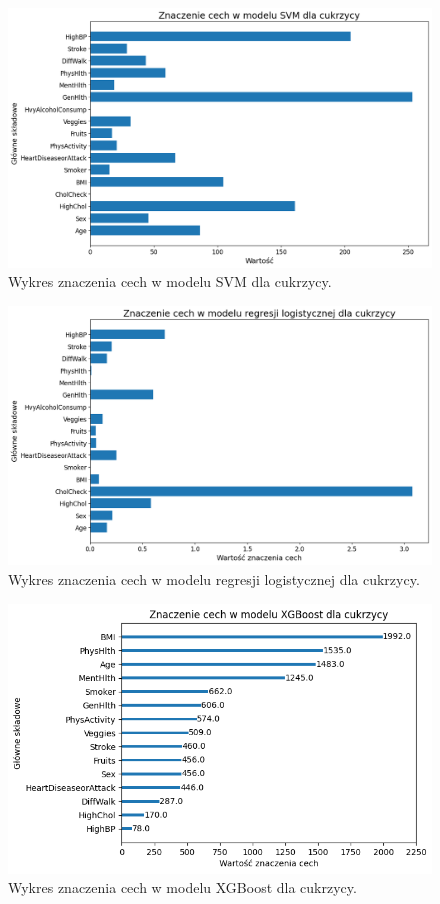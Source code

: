 \documentclass[onecolumn,12pt]{article}
\begin{document}
\begin{figure}[H]
    \centering
    \includegraphics[width=0.90\linewidth]{raport/graphs/cukrzyca_svm.png}
    \captionsetup{justification=centering}
    \caption{Wykres znaczenia cech w modelu SVM dla cukrzycy.}
\end{figure}

\begin{figure}[H]
    \centering
    \includegraphics[width=0.90\linewidth]{raport/graphs/cukrzyca_regresja.png}
    \captionsetup{justification=centering}
    \caption{Wykres znaczenia cech w modelu regresji logistycznej dla cukrzycy.}
\end{figure}

\begin{figure}[H]
    \centering
    \includegraphics[width=0.90\linewidth]{raport/graphs/cukrzyca_xgb.png}
    \captionsetup{justification=centering}
    \caption{Wykres znaczenia cech w modelu XGBoost dla cukrzycy.}
\end{figure}
\end{document}
